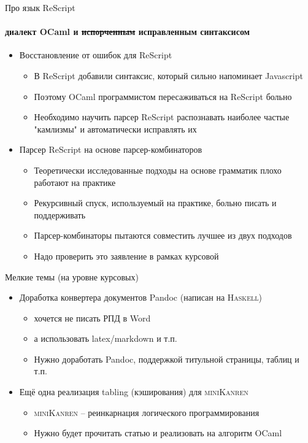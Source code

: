 \documentclass[aspectratio=169
  , xcolor={svgnames}
  , hyperref=
      { colorlinks
      , urlcolor=DarkBlue
      }  
  , 12pt
  , russian  %
  ]{beamer}
\begin{document}
\begin{frame}[fragile]{Про язык ReScript}
\framesubtitle{диалект OCaml и \sout{испорченным} исправленным синтаксисом}

\begin{itemize}
\item Восстановление от ошибок для ReScript
\href{http://kakadu.github.io/fp2020/projects.html#rescript-recovery}{\faGithub}
\begin{itemize}
\item В ReScript добавили синтаксис, который сильно напоминает Javascript
\item Поэтому OCaml программистом пересаживаться на ReScript больно
\item Необходимо научить парсер ReScript распознавать наиболее частые "камлизмы" и автоматически исправлять их
\end{itemize}\pause

\item Парсер ReScript на основе парсер-комбинаторов
\href{http://kakadu.github.io/fp2020/projects.html#rescript-combinators}{\faGithub}
\begin{itemize}
\item Теоретически исследованные подходы на основе грамматик плохо работают на практике
\item Рекурсивный спуск, используемый на практике, больно писать и поддерживать
\item Парсер-комбинаторы пытаются совместить лучшее из двух подходов
\item Надо проверить это заявление в рамках курсовой
\end{itemize}
\end{itemize}

\end{frame}



\begin{frame}[fragile]{Мелкие темы (на уровне курсовых) }
\begin{itemize}
\item Доработка конвертера документов Pandoc (написан на \textsc{Haskell})
\begin{itemize}
\item хочется не писать РПД в Word
\item а использовать latex/markdown и т.п.
\item Нужно доработать Pandoc, поддержкой титульной страницы, таблиц и т.п.
\end{itemize}\pause

\item Ещё одна реализация tabling (кэширования) для \textsc{miniKanren}
\begin{itemize}
\item \textsc{miniKanren} -- реинкарнация логического программирования
\item Нужно будет прочитать статью и реализовать на алгоритм OCaml
\end{itemize}
\end{itemize}

\end{frame}
\end{document}
